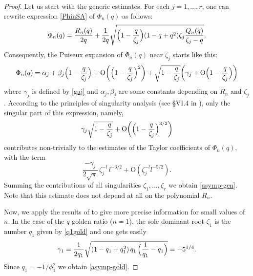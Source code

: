 \documentclass[11pt,reqno]{amsart}
\theoremstyle{plain}
\theoremstyle{definition}
\numberwithin{figure}{section}
\numberwithin{table}{section}
\numberwithin{equation}{section}
\newcommand\al{\alpha}
\newcommand\be{\beta}
\newcommand\ga{\gamma}
\newcommand\bigo{\mathrm{O}}
\let\fr=\frac
\begin{document}
\begin{proof}
Let us start with the generic estimates.
For each $j=1,\ldots,r$, one can rewrite expression \eqref{PhinSA}  of $\Phi_n(q)$ as follows:
\begin{equation*}
\Phi_n(q)=\fr{R_n(q)}{2q}+\fr{1}{2q}\sqrt{\Bigl(1-\fr{q}{\zeta_j}\Bigr)(1-q+q^2)\zeta_j\fr{Q_n(q)}{\zeta_j-q}}.
\end{equation*}
Consequently, the Puiseux expansion of $\Phi_n(q)$ near $\zeta_j$ starts like this:
\begin{equation*}
\Phi_n(q)=\al_j+\be_j\Bigl(1-\frac{q}{\zeta_j}\Bigr)+\bigo\biggl(\Bigl(1-\frac{q}{\zeta_j}\Bigr)^2\biggr)+
\sqrt{1-\fr{q}{\zeta_j}}\biggl(\ga_j+\bigo\Bigl(1-\frac{q}{\zeta_j}\Bigr)\biggr)
\end{equation*}
where $\ga_j$ is defined by \eqref{gaj} and $\al_j,\be_j$ are some constants depending on $R_n$ and $\zeta_j$. According to the principles of singularity analysis (see §VI.4 in \cite{FS}), only the singular part of this expression, namely, 
\begin{equation*}
\ga_j\sqrt{1-\fr{q}{\zeta_j}}+\bigo\biggl(\Bigl(1-\frac{q}{\zeta_j}\Bigr)^{3/2}\biggr)
\end{equation*} 
contributes non-trivially to the estimates of the Taylor coefficients of $\Phi_n(q)$, with the term
\begin{equation*}
\fr{-\ga_j}{2\sqrt{\pi}}\,\zeta_j^{-l}\,l^{-3/2}+\bigo(\zeta_j^{-l}l^{-5/2}).
\end{equation*} 
Summing the contributions of all singularities $\zeta_1,\ldots,\zeta_r$ we obtain \eqref{asymp-gen}. Note that this estimate does not depend at all on the polynomial $R_n$.

Now, we apply the results of  to give more precise information for small values of $n$. In the case of the $q$-golden ratio ($n=1$), the sole dominant root $\zeta_1$ is the number $q_1$ given by \eqref{q1gold} and one gets easily
\begin{equation*}
\ga_1=\fr{1}{2q_1}\sqrt{(1-q_1+q_1^2)\,q_1\, \Bigl(\fr 1{q_1}-q_1\Bigr)}=-5^{1/4}.
\end{equation*}
Since $q_1=-1/\phi_1^2$ we obtain \eqref{asymp-gold}.


\end{proof}
\end{document}
